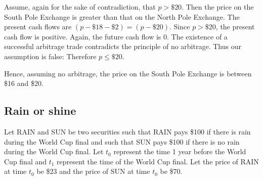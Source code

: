 \documentclass[12pt]{article}
\begin{document}
\begin{enumerate}
Assume, again for the sake of contradiction, that $p>\$20$. Then the price on the South Pole Exchange is greater than that on the North Pole Exchange. The present cash flows are $(p-\$18-\$2)=(p-\$20)$. Since $p>\$20$, the present cash flow is positive. Again, the future cash flow is 0. The existence of a successful arbitrage trade contradicts the principle of no arbitrage. Thus our assumption is false: Therefore $p\leq\$20$.

Hence, assuming no arbitrage, the price on the South Pole Exchange is between \$16 and \$20.
\end{enumerate}
\subsection{Rain or shine}
Let \textsc{RAIN} and \textsc{SUN} be two securities such that RAIN pays \$100 if there is rain during the World Cup final and such that SUN pays \$100 if there is no rain during the World Cup final. Let $t_0$ represent the time 1 year before the World Cup final and $t_1$ represent the time of the World Cup final. Let the price of \textsc{RAIN} at time $t_0$ be \$23 and the price of \textsc{SUN} at time $t_0$ be \$70.
\end{document}
